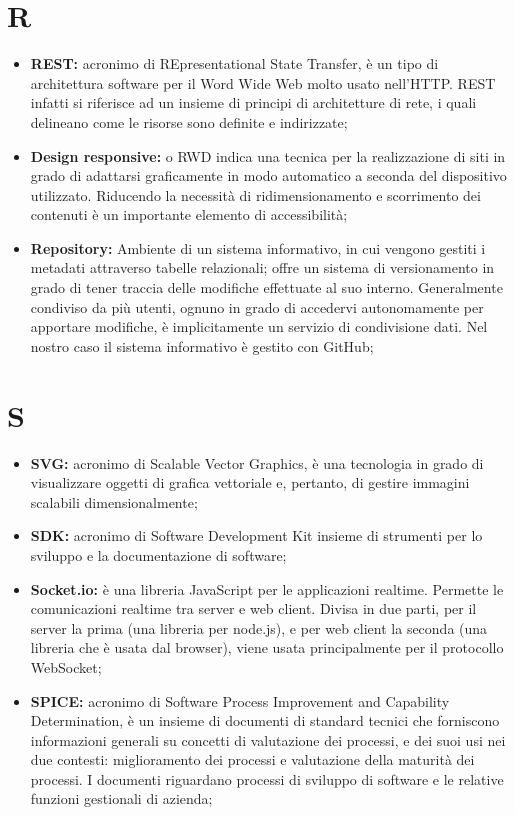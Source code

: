 \section*{R} %
\label{sec:r}
	\begin{itemize}
		\item \textbf{REST:} acronimo di REpresentational State Transfer, è un tipo di architettura software per il Word Wide Web molto usato nell'HTTP. REST infatti si riferisce ad un insieme di principi di architetture di rete, i quali delineano come le risorse sono definite e indirizzate;
		\item \textbf{Design responsive:} o RWD indica una tecnica per la realizzazione di siti in grado di adattarsi graficamente in modo automatico a seconda del dispositivo utilizzato. Riducendo la necessità di ridimensionamento e scorrimento dei contenuti è un importante elemento di accessibilità;
		\item \textbf{Repository:} Ambiente di un sistema informativo, in cui vengono gestiti i metadati attraverso tabelle relazionali; offre un sistema di versionamento in grado di tener traccia delle modifiche effettuate al suo interno. Generalmente condiviso da più utenti, ognuno in grado di accedervi autonomamente per apportare modifiche, è implicitamente un servizio di condivisione dati. Nel nostro caso il sistema informativo è gestito con GitHub;
	\end{itemize}
\pagebreak


\section*{S} %
\label{sec:s}
	\begin{itemize}
		\item \textbf{SVG:} acronimo di Scalable Vector Graphics, è una tecnologia in grado di visualizzare oggetti di grafica vettoriale e, pertanto, di gestire immagini scalabili dimensionalmente;
		\item \textbf{SDK:} acronimo di Software Development Kit insieme di strumenti per lo sviluppo e la documentazione di software;
		\item \textbf{Socket.io:} è una libreria JavaScript per le applicazioni realtime. Permette le comunicazioni realtime tra server e web client. Divisa in due parti, per il server la prima (una libreria per node.js), e per web client la seconda (una libreria che è usata dal browser), viene usata principalmente per il protocollo WebSocket;
		\item \textbf{SPICE:} acronimo di Software Process Improvement and Capability Determination, è un insieme di documenti di standard tecnici che forniscono informazioni generali su concetti di valutazione dei processi, e dei suoi usi nei due contesti: miglioramento dei processi e valutazione della maturità dei processi. I documenti riguardano processi di sviluppo di software e le relative funzioni gestionali di azienda;
	\end{itemize}
\pagebreak

